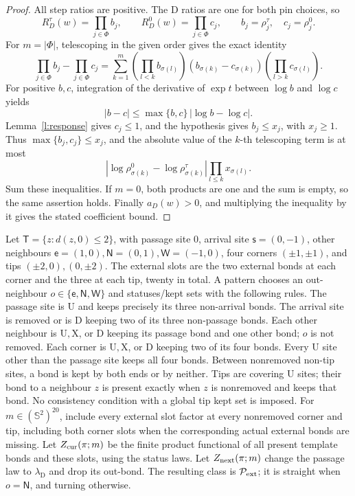 \begin{proof}
All step ratios are positive. The \(\mathrm D\) ratios are one
for both pin choices, so
\[
 R_D^\tau(w)=\prod_{j\in\Phi}b_j,\qquad
 R_D^0(w)=\prod_{j\in\Phi}c_j,\qquad
 b_j=\rho_j^\tau,\quad c_j=\rho_j^0.
\]
For \(m=|\Phi|\), telescoping in the given order gives the exact
identity
\[
 \prod_{j\in\Phi}b_j-\prod_{j\in\Phi}c_j
 =\sum_{k=1}^m
   \left(\prod_{l<k}b_{\sigma(l)}\right)
   (b_{\sigma(k)}-c_{\sigma(k)})
   \left(\prod_{l>k}c_{\sigma(l)}\right).
\]
For positive \(b,c\), integration of the derivative of
\(\exp t\) between \(\log b\) and \(\log c\) yields
\[
 |b-c|\le\max\{b,c\}\,|\log b-\log c|.
\]
Lemma~\ref{l:response} gives \(c_j\le1\), and the hypothesis
gives \(b_j\le x_j\), with \(x_j\ge1\).
Thus \(\max\{b_j,c_j\}\le x_j\), and the absolute value of
the \(k\)-th telescoping term is at most
\[
 |\log\rho_{\sigma(k)}^0-\log\rho_{\sigma(k)}^\tau|
          \prod_{l\le k}x_{\sigma(l)}.
\]
Sum these inequalities. If \(m=0\), both products are one and
the sum is empty, so the same assertion holds.
Finally \(a_D(w)>0\), and multiplying the inequality by it
gives the stated coefficient bound.
\end{proof}

\begin{definition}\label{d:pattern}
Let \(\mathsf T=\{z:d(z,0)\le2\}\), with passage site \(0\),
arrival site \(\mathsf s=(0,-1)\), other neighbours
\(\mathsf e=(1,0),\mathsf N=(0,1),\mathsf W=(-1,0)\),
four corners \((\pm1,\pm1)\), and tips \((\pm2,0),(0,\pm2)\).
The external slots are the two external bonds at each corner and
the three at each tip, twenty in total.
A pattern chooses an out-neighbour \(o\in\{\mathsf e,\mathsf N,\mathsf W\}\)
and statuses/kept sets with the following rules.
The passage site is \(\mathrm U\) and keeps precisely its three
non-arrival bonds. The arrival site is removed or is \(\mathrm D\)
keeping two of its three non-passage bonds.
Each other neighbour is \(\mathrm U,\mathrm X\), or \(\mathrm D\)
keeping its passage bond and one other bond; \(o\) is not removed.
Each corner is \(\mathrm U,\mathrm X\), or \(\mathrm D\) keeping
two of its four bonds. Every \(\mathrm U\) site other than the
passage site keeps all four bonds.
Between nonremoved non-tip sites, a bond is kept by both ends or
by neither. Tips are covering \(\mathrm U\) sites; their bond to
a neighbour \(z\) is present exactly when \(z\) is nonremoved and
keeps that bond. No consistency condition with a global tip kept
set is imposed.
For \(m\in(\mathbb S^2)^{20}\), include every external slot factor
at every nonremoved corner and tip, including both corner slots
when the corresponding actual external bonds are missing.
Let \(Z_{\rm cur}(\pi;m)\) be the finite product functional of
all present template bonds and these slots, using the status laws.
Let \(Z_{\rm next}(\pi;m)\) change the passage law to
\(\lambda_{\mathrm D}\) and drop its out-bond.
The resulting class is \(\mathcal P_{\rm ext}\); it is straight
when \(o=\mathsf N\), and turning otherwise.
\end{definition}


